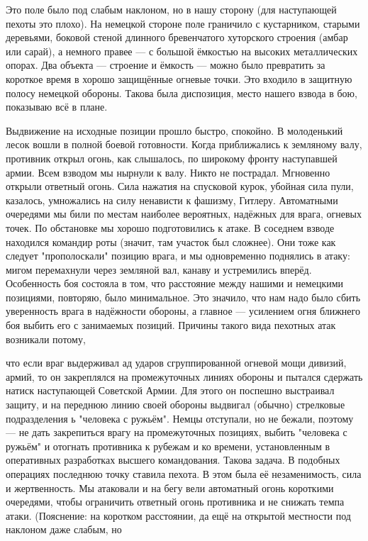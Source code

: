\label{6-1}
Это поле было под слабым наклоном, но в нашу сторону (для наступающей пехоты это плохо). На немецкой стороне поле граничило с кустарником, старыми деревьями, боковой стеной длинного бревенчатого хуторского строения (амбар или сарай), а немного правее — с большой ёмкостью на высоких металлических опорах. Два объекта — строение и ёмкость — можно было превратить за короткое время в хорошо защищённые огневые точки. Это входило в защитную полосу немецкой обороны. Такова была диспозиция, место нашего взвода в бою, показываю всё в плане.

\label{7-1}
Выдвижение на исходные позиции прошло быстро, спокойно. В молоденький лесок вошли в полной боевой готовности. Когда приближались к земляному валу, противник открыл огонь, как слышалось, по широкому фронту наступавшей армии. Всем взводом мы нырнули к валу. Никто не пострадал. Мгновенно открыли ответный огонь. Сила нажатия на спусковой курок, убойная сила пули, казалось, умножались на силу ненависти к фашизму, Гитлеру. Автоматными очередями мы били по местам наиболее вероятных, надёжных для врага, огневых точек. По обстановке мы хорошо подготовились к атаке. В соседнем взводе находился командир роты (значит, там участок был сложнее). Они тоже как следует "прополоскали" позицию врага, и мы одновременно поднялись в атаку: мигом перемахнули через земляной вал, канаву и устремились вперёд. Особенность боя состояла в том, что расстояние между нашими и немецкими позициями, повторяю, было минимальное. Это значило, что нам надо было сбить уверенность врага в надёжности обороны, а главное — усилением огня ближнего боя выбить его с занимаемых позиций. Причины такого вида пехотных атак возникали потому,


\label{8-1}

что если враг выдерживал ад ударов сгруппированной огневой мощи дивизий, армий, то он закреплялся на промежуточных линиях обороны и пытался сдержать натиск наступающей Советской Армии. Для этого он поспешно выстраивал защиту, и на переднюю линию своей обороны выдвигал (обычно) стрелковые подразделения ь "человека с ружьём". Немцы отступали, но не бежали, поэтому — не дать закрепиться врагу на промежуточных позициях, выбить "человека с ружьём" и отогнать противника к рубежам и ко времени, установленным в оперативных разработках высшего командования. Такова задача. В подобных операциях последнюю точку ставила пехота. В этом была её незаменимость, сила и жертвенность.
Мы атаковали и на бегу вели автоматный огонь короткими очередями, чтобы ограничить ответный огонь противника и не снижать темпа атаки. (Пояснение: на коротком расстоянии, да ещё на открытой местности под наклоном даже слабым, но


